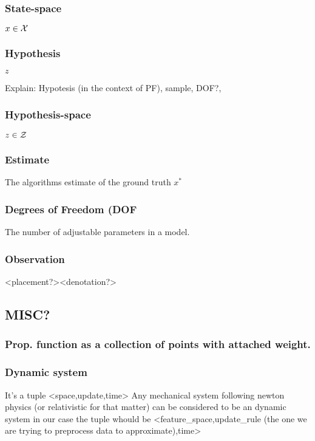 \subsubsection{State-space}
$x\in\mathcal{X}$ %
\subsubsection{Hypothesis}
$z$

Explain: Hypotesis (in the context of PF), sample, DOF?, 

\subsubsection{Hypothesis-space}
$z\in\mathcal{Z}$

\subsubsection{Estimate}
The algorithms estimate of the ground truth
$x^*$ 

\subsubsection{Degrees of Freedom (DOF}
The number of adjustable parameters in a model.

\subsubsection{Observation}
<placement?><denotation?>

\subsection{MISC?}

\subsubsection{Prop. function as a collection of points with attached weight.}

\subsubsection{Dynamic system}
    It's a tuple <space,update,time>
    Any mechanical system following newton physics (or relativistic for that matter) can be considered to be an dynamic system
    in our case the tuple whould be <feature\_space,update\_rule (the one we are trying to preprocess data to approximate),time>

